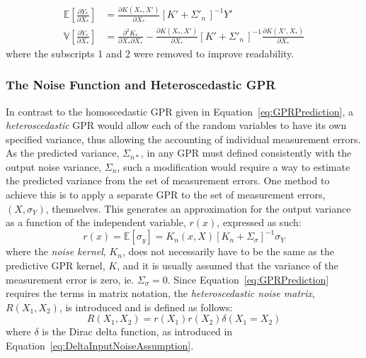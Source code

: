 \documentclass{article}
\begin{document}
\begin{equation}
\label{eq:GPRDerivativePrediction}
	\begin{aligned}
	\mathbb{E}\!\left[\frac{\partial Y_*}{\partial X_*}\right] &= \frac{\partial K\!\left(X_*,X'\right)}{\partial X_*} \left[K' + \Sigma'_n\,\right]^{-1} Y' \\
	\mathbb{V}\!\left[\frac{\partial Y_*}{\partial X_*}\right] &= \frac{\partial^2 K_*}{\partial X_* \partial X_*} - \frac{\partial K\!\left(X_*,X'\right)}{\partial X_*} \left[K' + \Sigma'_n\,\right]^{-1} \frac{\partial K\!\left(X',X_*\right)}{\partial X_*}
	\end{aligned}
\end{equation}
where the subscripts 1 and 2 were removed to improve readability.

\subsubsection{The Noise Function and Heteroscedastic GPR}
\label{subsubsec:GPRNoiseFunction}

In contrast to the homoscedastic GPR given in Equation~\eqref{eq:GPRPrediction}, a \emph{heteroscedastic} GPR would allow each of the random variables to have its own specified variance, thus allowing the accounting of individual measurement errors. As the predicted variance, $\Sigma_{n*}$, in any GPR must defined consistently with the output noise variance, $\Sigma_n$, such a modification would require a way to estimate the predicted variance from the set of measurement errors. One method to achieve this is to apply a separate GPR to the set of measurement errors, $\left(X,\sigma_Y\right)$, themselves. This generates an approximation for the output variance as a function of the independent variable, $r\!\left(x\right)$, expressed as such:
\begin{equation}
\label{eq:GPRNoiseFunction}
	r\!\left(x\right) = \mathbb{E}\!\left[\sigma_y\right] = K_n\!\left(x,X\right) \left[K_n + \Sigma_\sigma\right]^{-1} \sigma_Y
\end{equation}
where the \emph{noise kernel}, $K_n$, does not necessarily have to be the same as the predictive GPR kernel, $K$, and it is usually assumed that the variance of the measurement error is zero, ie. $\Sigma_\sigma = 0$. Since Equation~\eqref{eq:GPRPrediction} requires the terms in matrix notation, the \emph{heteroscedastic noise matrix}, $R\!\left(X_1,X_2\right)$, is introduced and is defined as follows:
\begin{equation}
\label{eq:GPRHeteroscedasticNoiseMatrix}
	R\!\left(X_1,X_2\right) = r\!\left(X_1\right) r\!\left(X_2\right) \delta\!\left(X_1 = X_2\right)
\end{equation}
where $\delta$ is the Dirac delta function, as introduced in Equation~\eqref{eq:DeltaInputNoiseAssumption}.
\end{document}
